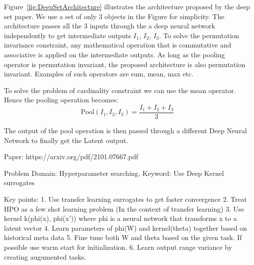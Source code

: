 \documentclass[12pt, twoside, ngerman]{report}
\begin{document}
Figure~\ref{fig:DeepSetArchitecture} illustrates the architecture proposed by the deep set paper.
We use a set of only 3 objects in the Figure for simplicity.
The architecture passes all the 3 inputs through the a deep neural network independently to get intermediate outputs $I_1$, $I_2$, $I_3$.
To solve the permutation invariance constraint,  any mathematical operation that is commutative and associative is applied on the intermediate outputs.
As long as the pooling operator is permutation invariant, the proposed architecture is also permutation invariant.
Examples of such operators are sum, mean, max etc.

To solve the problem of cardinality constraint we can use the mean operator.
Hence the pooling operation becomes:
$$
\textrm{Pool}(I_1, I_2, I_3) = \frac{ I_1 + I_2 + I_3}{3}
$$

The output of the pool operation is then passed through a different Deep Neural Network to finally get the Latent output.

\iffalse
Paper: https://arxiv.org/pdf/2101.07667.pdf

Problem Domain: Hyperparameter searching.
Keyword: Use Deep Kernel surrogates

Key points:
    1. Use transfer learning surrogates to get faster convergence
    2. Treat HPO as a few shot learning problem (In the context of transfer learning)
    3. Use kernel k(phi(x), phi(x')) where phi is a neural network that transforms x to a latent vector
    4. Learn parameters of phi(W) and kernel(theta) together based on historical meta data
    5. Fine tune both W and theta based on the given task. If possible use warm start for initialization.
    6. Learn output range variance by creating augumented tasks.
\end{document}
